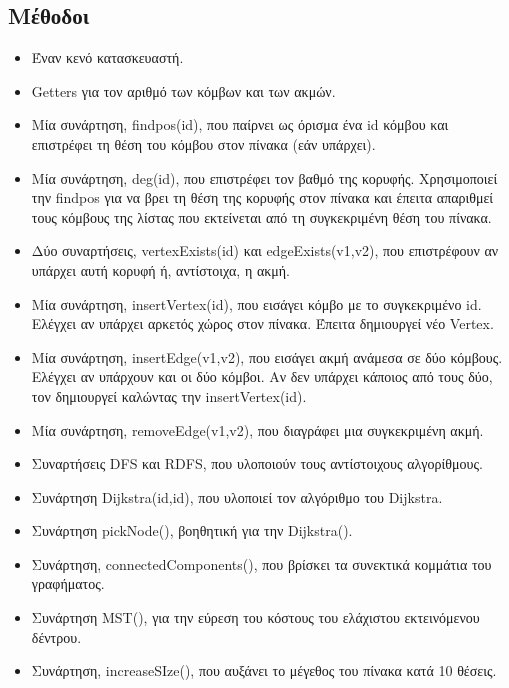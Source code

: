\documentclass[12pt,a4paper]{article}
\begin{document}
    \subsection*{Μέθοδοι}
    \begin{itemize}
        \item Έναν κενό κατασκευαστή.
        \item Getters για τον αριθμό των κόμβων και των ακμών.
        \item Μία συνάρτηση, findpos(id), που παίρνει ως όρισμα ένα id κόμβου και επιστρέφει τη θέση του κόμβου στον πίνακα (εάν υπάρχει).
        \item Μία συνάρτηση, deg(id), που επιστρέφει τον βαθμό της κορυφής. 
        Χρησιμοποιεί την findpos για να βρει τη θέση της κορυφής στον πίνακα και έπειτα απαριθμεί τους κόμβους της λίστας που εκτείνεται από τη συγκεκριμένη θέση του πίνακα.
        \item Δύο συναρτήσεις, vertexExists(id) και edgeExists(v1,v2), που επιστρέφουν αν υπάρχει αυτή κορυφή ή, αντίστοιχα, η ακμή.
        \item Μία συνάρτηση, insertVertex(id), που εισάγει κόμβο με το συγκεκριμένο id. Ελέγχει αν υπάρχει αρκετός χώρος στον πίνακα. Έπειτα δημιουργεί νέο Vertex.
        \item Μία συνάρτηση, insertEdge(v1,v2), που εισάγει ακμή ανάμεσα σε δύο κόμβους. Ελέγχει αν υπάρχουν και οι δύο κόμβοι. Αν δεν υπάρχει κάποιος από τους δύο, τον δημιουργεί καλώντας την insertVertex(id). 
        \item Μία συνάρτηση, removeEdge(v1,v2), που διαγράφει μια συγκεκριμένη ακμή.
        \item Συναρτήσεις DFS και RDFS, που υλοποιούν τους αντίστοιχους αλγορίθμους.
        \item Συνάρτηση Dijkstra(id,id), που υλοποιεί τον αλγόριθμο του Dijkstra.
        \item Συνάρτηση pickNode(), βοηθητική για την Dijkstra().
        \item Συνάρτηση, connectedComponents(), που βρίσκει τα συνεκτικά κομμάτια του γραφήματος.
        \item Συνάρτηση MST(), για την εύρεση του κόστους του ελάχιστου εκτεινόμενου δέντρου. 
        \item Συνάρτηση, increaseSIze(), που αυξάνει το μέγεθος του πίνακα κατά 10 θέσεις. 
    \end{itemize}
\end{document}

